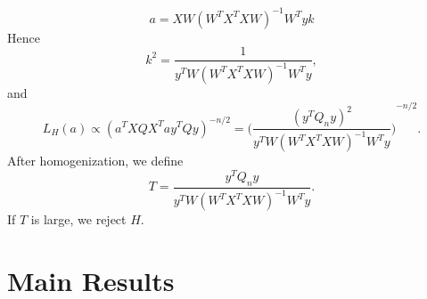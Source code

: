 \documentclass[review]{elsarticle}
\theoremstyle{plain}
\theoremstyle{definition}
\theoremstyle{remark}
\begin{document}
    \begin{equation}
        a=XW{(W^T X^T X W)}^{-1} W^T y k 
    \end{equation}
    Hence 
    \begin{equation}
        k^2=\frac{1}{y^T W{(W^T X^T X W)}^{-1} W^T y},
    \end{equation}
    and 
    \begin{equation}
        L_H (a)\propto {(a^T X Q X^T a y^T Q y)}^{-n/2}={\Big(\frac{{(y^T Q_n y)}^2}{y^T W{(W^T X^T X W)}^{-1} W^T y}\Big)}^{-n/2}.
    \end{equation}
After homogenization, we define
\[
    T=\frac{y^T Q_n y}{
        y^T W{(W^T X^T X W)}^{-1}W^T y
    }.
    \]
If $T$ is large, we reject $H$.












\section{Main Results}
\end{document}
